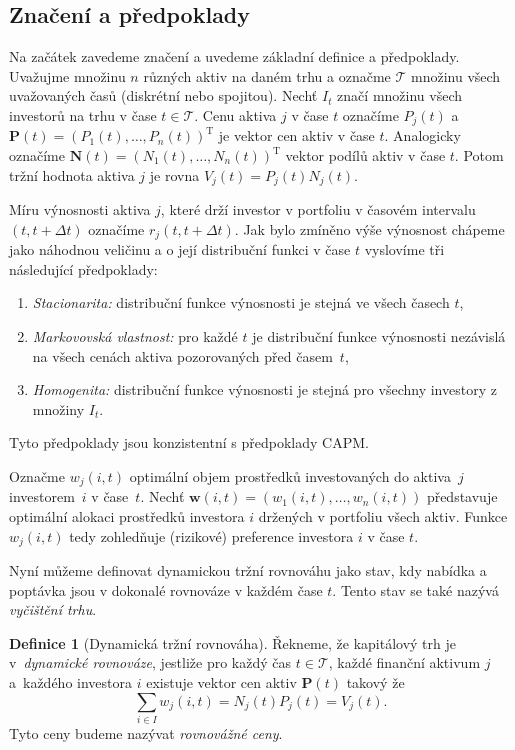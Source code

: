 \documentclass[a4paper,12pt]{report}
\theoremstyle{definition} \newtheorem{definice}[veta]{Definice}
\theoremstyle{remark}
\begin{document}
\subsection{Značení a předpoklady}
Na začátek zavedeme značení a  uvedeme základní definice a předpoklady. 
Uvažujme množinu $n$ různých aktiv na daném trhu a označme $\mathcal{T}$ množinu všech uvažovaných časů (diskrétní nebo spojitou).
Nechť $I_t$ značí množinu všech investorů na trhu v čase $t\in \mathcal{T}$.
Cenu aktiva $j$ v čase $t$ označíme $P_j(t)$ a~$\boldsymbol{P}(t)=(P_1(t),\dots,P_n(t))^\mathrm{T}$ je vektor cen aktiv v čase $t$.
Analogicky označíme $\boldsymbol{N}(t)=(N_1(t),\dots,N_n(t))^\mathrm{T}$ vektor podílů aktiv v čase $t$.
Potom tržní hodnota aktiva $j$ je rovna $V_j(t)=P_j(t)N_j(t)$.

Míru výnosnosti aktiva $j$, které drží investor v portfoliu v časovém intervalu $(t,t+\Delta t)$ označíme $r_j(t,t+\Delta t)$.
Jak bylo zmíněno výše výnosnost chápeme jako náhodnou veličinu a o její distribuční funkci v čase $t$ vyslovíme tři následující předpoklady:
\begin{enumerate}
\item \label{Stacionarita} \textit{Stacionarita:} distribuční funkce výnosnosti  je stejná ve všech časech $t$,                                                                            
\item \label{Martingalvl} \textit{Markovovská vlastnost:} pro každé $t$ je distribuční funkce výnosnosti nezávislá na všech cenách aktiva pozorovaných před časem~$t$,
\item \label{Homogenita} \textit{Homogenita:} distribuční funkce výnosnosti je stejná pro všechny investory z množiny $I_t$. 
\end{enumerate} 
Tyto předpoklady jsou konzistentní s předpoklady CAPM.

Označme $w_{j}(i,t)$ optimální objem prostředků investovaných do aktiva~$j$ investorem~$i$ v čase~$t$.
Nechť $\boldsymbol{w}(i,t)=(w_{1}(i,t),\dots,w_{n}(i,t))$ představuje optimální alokaci prostředků investora $i$ držených v portfoliu všech aktiv.
Funkce $w_{j}(i,t)$ tedy zohledňuje (rizikové) preference investora $i$ v čase $t$.
  
Nyní můžeme definovat dynamickou tržní rovnováhu jako stav, kdy  nabídka a poptávka jsou v dokonalé rovnováze v každém čase $t$.
Tento stav se také nazývá \textit{vyčištění trhu}.
         
\begin{definice}[Dynamická tržní rovnováha]
Řekneme, že kapitálový trh je v~\textit{dynamické rovnováze}, jestliže pro každý čas $t\in \mathcal{T}$, každé finanční aktivum $j$ a~každého investora $i$ existuje vektor cen aktiv $\boldsymbol{P}(t)$ takový že
$$\sum_{i\in I} w_{j}(i,t)=N_j(t)P_j(t)=V_j(t).$$
Tyto ceny budeme nazývat \textit{rovnovážné ceny}.
\end{definice}
\end{document}
